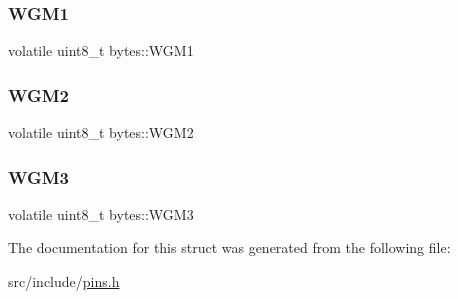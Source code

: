 \subsubsection{\texorpdfstring{W\+G\+M1}{WGM1}}
{\footnotesize\ttfamily volatile uint8\+\_\+t bytes\+::\+W\+G\+M1}

\mbox{\label{structbytes_a89629be7fefa4977a3caa8f221b91054}} 
\subsubsection{\texorpdfstring{W\+G\+M2}{WGM2}}
{\footnotesize\ttfamily volatile uint8\+\_\+t bytes\+::\+W\+G\+M2}

\mbox{\label{structbytes_a47af88f959a9d6186d912858a44044dc}} 
\subsubsection{\texorpdfstring{W\+G\+M3}{WGM3}}
{\footnotesize\ttfamily volatile uint8\+\_\+t bytes\+::\+W\+G\+M3}



The documentation for this struct was generated from the following file\+:\begin{DoxyCompactItemize}
\item 
src/include/\mbox{\hyperlink{pins_8h}{pins.\+h}}\end{DoxyCompactItemize}
